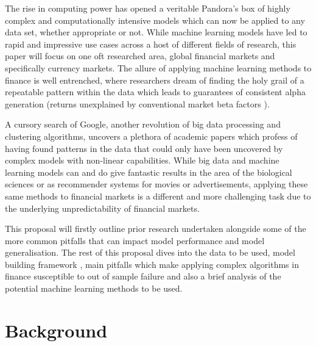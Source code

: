 \documentclass[11pt, a4paper]{article}
\begin{document}
\par
The rise in computing power has opened a veritable Pandora's box of highly complex and computationally intensive models which can now be applied to any data set, whether appropriate or not. While machine learning models have led to rapid and impressive use cases across a host of different fields of research, this paper will focus on one oft researched area, global financial markets and specifically currency markets.
The allure of applying machine learning methods to finance is well entrenched, where researchers dream of finding the holy grail of a repeatable pattern within the data which leads to guarantees of consistent alpha generation (returns unexplained by conventional market beta factors \cite{Rebonato2017}).
\par 
A cursory search of Google, another revolution of big data processing and clustering algorithms, uncovers a plethora of academic papers which profess of having found patterns in the data that could only have been uncovered by complex models with non-linear capabilities. While big data and machine learning models can and do give fantastic results in the area of the biological sciences or as recommender systems for movies or advertisements, applying these same methods to financial markets is a different and more challenging task due to the underlying unpredictability of financial markets.\par

This proposal will firstly outline prior research undertaken alongside some of the more common pitfalls that can impact model performance and model generalisation. The rest of this proposal dives into the data to be used, model building framework , main pitfalls which make applying complex algorithms in finance susceptible to out of sample failure \cite{LopezdePrado2018} and also a brief analysis of the potential machine learning methods to be used.
\par

\section{Background}
\end{document}
